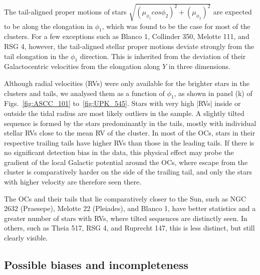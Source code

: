 \documentclass{aa}
\begin{document}
The tail-aligned proper motions of stars $\sqrt{(\mu_{\phi_{1}} cos \phi_2)^2+ (\mu_{\phi_{2}})^2 }$ are expected to be along the elongation in $\phi_1$, which was found to be the case for most of the clusters. For a few exceptions such as Blanco 1, Collinder 350, Melotte 111, and RSG 4, however, the tail-aligned stellar proper motions deviate strongly from the tail elongation in the $\phi_1$ direction. This is inherited from the deviation of their Galactocentric velocities from the elongation along $Y$ in three dimensions.  

Although radial velocities (RVs) were only available for the brighter stars in the clusters and tails, we analysed them as a function of $\phi_1$, as shown in panel (k) of Figs.~\ref{fig:ASCC_101} to~\ref{fig:UPK_545}. Stars with very high |RVs| inside or outside the tidal radius are most likely outliers in the sample. A slightly tilted sequence is formed by the stars predominantly in the tails, mostly with individual stellar RVs close to the mean RV of the cluster. In most of the OCs, stars in their respective trailing tails have higher RVs than those in the leading tails. If there is no significant detection bias in the data, this physical effect may probe the gradient of the local Galactic potential around the OCs, where escape from the cluster is comparatively harder on the side of the trailing tail, and only the stars with higher velocity are therefore seen there.


The OCs and their tails that lie comparatively closer to the Sun, such as NGC 2632 (Praesepe), Melotte 22 (Pleiades), and Blanco 1, have better statistics and a greater number of stars with RVs, where tilted sequences are distinctly seen. In others, such as Theia 517, RSG 4, and Ruprecht 147, this is less distinct, but still clearly visible.


\subsection{Possible biases and incompleteness}\label{sec: Possible biases }
\end{document}
